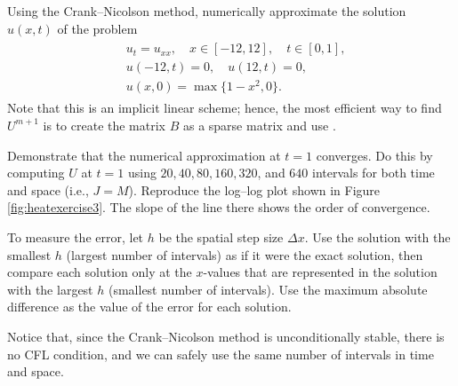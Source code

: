 \begin{problem}
\label{prob:heat_exercise3}
Using the Crank--Nicolson method, numerically approximate the solution $u(x,t)$ of the problem
\begin{align}
	\begin{split}
	&{ } u_t = u_{xx}, \quad x \in [-12,12],\quad t \in [0,1],\\
	&{ } u(-12,t) = 0,\quad u(12,t) = 0,\\
	&{ } u(x,0) = \max\{1 - x^2,0\}.
	\end{split}
\end{align}
Note that this is an implicit linear scheme; hence, the most efficient way to find $U^{m+1}$ is to create the matrix $B$ as a sparse matrix and use .

Demonstrate that the numerical approximation at $t = 1$ converges.
Do this by computing $U$ at $t=1$ using $20, 40, 80, 160, 320$, and $640$ intervals for both time and space (i.e., $J = M$).
Reproduce the log--log plot shown in Figure \ref{fig:heatexercise3}.
The slope of the line there shows the order of convergence.

To measure the error, let $h$ be the spatial step size $\Delta x$.
Use the solution with the smallest $h$ (largest number of intervals) as if it were the exact solution, then compare each solution only at the $x$-values that are represented in the solution with the largest $h$ (smallest number of intervals).
Use the maximum absolute difference as the value of the error for each solution.

Notice that, since the Crank--Nicolson method is unconditionally stable, there is no CFL condition, and we can safely use the same number of intervals in time and space.
\end{problem}